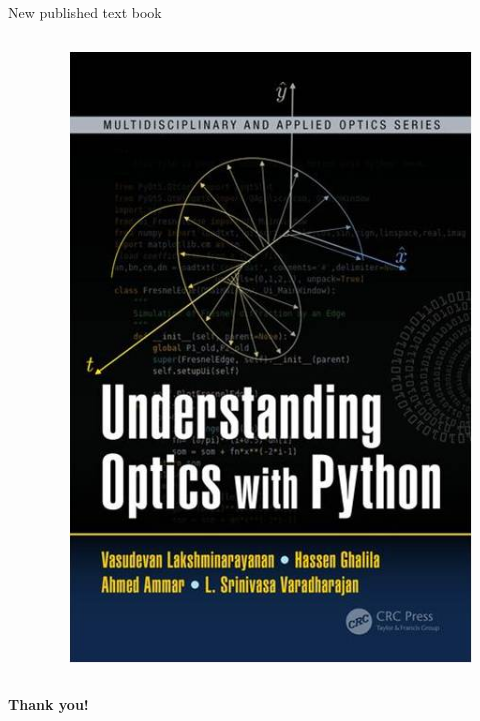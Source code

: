 \documentclass[serif ,mathserif, 8pt]{beamer}
\begin{document}
\begin{frame}{New published text book}
\begin{columns}[c]
\begin{column}{0.6\textwidth}
		
	\end{column}
	\begin{column}{0.4\textwidth}
		\begin{figure}
			\includegraphics[width=\linewidth]{images/Image5}
			
		\end{figure}
	\end{column}
\end{columns}

\end{frame}


\begin{frame}
\centering
\huge \textbf{Thank you!}
\end{frame}
\end{document}

